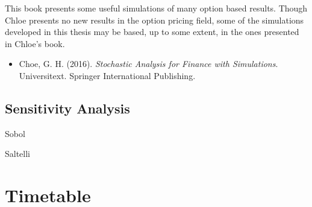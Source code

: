 \documentclass[a4paper,prd,twocolumn,nofootinbib,superscriptaddress,floatfix]{revtex4}
\begin{document}
This book presents some useful simulations of many option based results. Though Chloe presents no new results in the option pricing field, some of the simulations developed in this thesis may be based, up to some extent, in the ones presented in Chloe's book.
\begin{itemize}
\item Choe, G. H. (2016). \textit{Stochastic Analysis for Finance with Simulations}. Universitext. Springer International Publishing. 
\end{itemize}

\subsection{Sensitivity Analysis}
Sobol


Saltelli

\section{Timetable}

\end{document}

